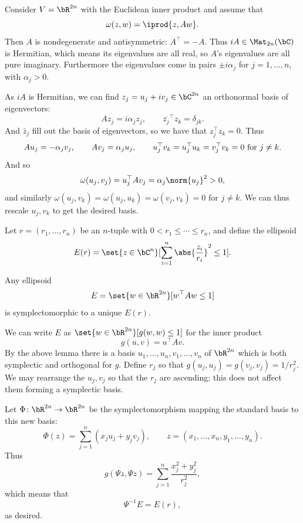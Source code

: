 \elemm

\bproof

    Consider $V=\bR^{2n}$ with the Euclidean inner product and assume that
    $$ \omega(z,w) = \iprod{z,Aw} . $$
    Then $A$ is nondegenerate and antisymmetric: $A^\top=-A$.
    Thus $iA\in\Mat_{2n}(\bC)$ is Hermitian, which means its eigenvalues are all real, so $A$'s eigenvalues are all pure imaginary.
    Furthermore the eigenvalues come in pairs $\pm i\alpha_j$ for $j=1,\dots,n$, with $\alpha_j>0$.

    As $iA$ is Hermitian, we can find $z_j=u_j+iv_j\in\bC^{2n}$ an orthonormal basis of eigenvectors:
    $$ Az_j = i\alpha_jz_j,\qquad \bar{z_j}^\top z_k = \delta_{jk} . $$
    And $\bar z_j$ fill out the basis of eigenvectors, so we have that $z_j^\top z_k=0$.
    Thus
    $$ Au_j = -\alpha_jv_j,\qquad Av_j = \alpha_ju_j,\qquad u_j^\top v_k = u_j^\top u_k = v_j^\top v_k = 0\hbox{ for $j\neq k$}. $$
    And so
    $$ \omega(u_j,v_j) = u_j^\top Av_j = \alpha_j\norm{u_j}^2 > 0, $$
    and similarly $\omega(u_j,v_k)=\omega(u_j,u_k)=\omega(v_j,v_k)=0$ for $j\neq k$.
    We can thus rescale $u_j,v_k$ to get the desired basis.

\eproof

Let $r=(r_1,\dots,r_n)$ be an $n$-tuple with $0<r_1\leq\cdots\leq r_n$, and define the ellipsoid
$$ E(r) = \set{z\in\bC^n}[\sum_{i=1}^n\abs{\frac{z_i}{r_i}}^2\leq1] . $$

\blemm

    Any ellipsoid
    $$ E = \set{w\in\bR^{2n}}[w^\top Aw\leq1] $$
    is symplectomorphic to a unique $E(r)$.

\elemm

\bproof

    We can write $E$ as $\set{w\in\bR^{2n}}[g(w,w)\leq1]$ for the inner product
    $$ g(u,v) = u^\top Av . $$
    By the above lemma there is a basis $u_1,\dots,u_n,v_1,\dots,v_n$ of $\bR^{2n}$ which is both symplectic and orthogonal for $g$.
    Define $r_j$ so that $g(u_j,u_j)=g(v_j,v_j)=1/r_j^2$.
    We may rearrange the $u_j,v_j$ so that the $r_j$ are ascending; this does not affect them forming a symplectic basis.

    Let $\Phi\colon\bR^{2n}\to\bR^{2n}$ be the symplectomorphism mapping the standard basis to this new basis:
    $$ \Phi(z) = \sum_{j=1}^n(x_ju_j + y_jv_j),\qquad z=(x_1,\dots,x_n,y_1,\dots,y_n) . $$
    Thus
    $$ g(\Psi z,\Psi z) = \sum_{j=1}^n\frac{x_j^2+y_j^2}{r_j^2} , $$
    which means that
    $$ \Psi^{-1}E = E(r) , $$
    as desired.

